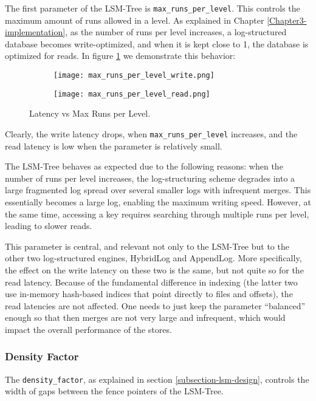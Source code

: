 The first parameter of the LSM-Tree is \verb"max_runs_per_level". This controls the maximum amount of runs allowed in a level. As explained in Chapter \ref{Chapter3-implementation}, as the number of runs per level increases, a log-structured database becomes write-optimized, and when it is kept close to 1, the database is optimized for reads. In figure \ref{fig:max-runs-per-level} we demonstrate this behavior:

\begin{figure}[h]
    \begin{subfigure}{.5\textwidth}
        \centering
        \texttt{[image: max\_runs\_per\_level\_write.png]}
    \end{subfigure}
    \begin{subfigure}{.5\textwidth}
        \centering
        \texttt{[image: max\_runs\_per\_level\_read.png]}
    \end{subfigure}
    \caption{Latency vs Max Runs per Level.}
    \label{fig:max-runs-per-level}
\end{figure}

Clearly, the write latency drops, when \verb"max_runs_per_level" increases, and the read latency is low when the parameter is relatively small.

The LSM-Tree behaves as expected due to the following reasons: when the number of runs per level increases, the log-structuring scheme degrades into a large fragmented log spread over several smaller logs with infrequent merges. This essentially becomes a large log, enabling the maximum writing speed. However, at the same time, accessing a key requires searching through multiple runs per level, leading to slower reads.

This parameter is central, and relevant not only to the LSM-Tree but to the other two log-structured engines, HybridLog and AppendLog. More specifically, the effect on the write latency on these two is the same, but not quite so for the read latency. Because of the fundamental difference in indexing (the latter two use in-memory hash-based indices that point directly to files and offsets), the read latencies are not affected. One needs to just keep the parameter ``balanced'' enough so that then merges are not very large and infrequent, which would impact the overall performance of the stores.

\subsubsection{Density Factor}
The \verb"density_factor", as explained in section \ref{subsection-lsm-design}, controls the width of gaps between the fence pointers of the LSM-Tree.

